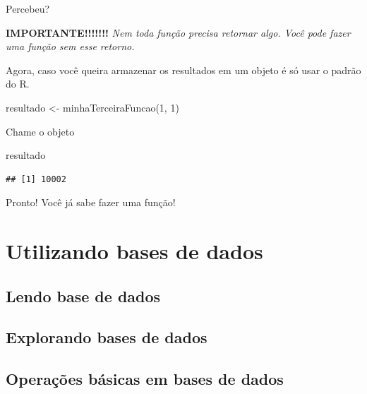 \documentclass[
]{book}
\newenvironment{Shaded}{\begin{snugshade}}{\end{snugshade}}
\newcommand{\DecValTok}[1]{\textcolor[rgb]{0.00,0.00,0.81}{#1}}
\newcommand{\FunctionTok}[1]{\textcolor[rgb]{0.00,0.00,0.00}{#1}}
\newcommand{\NormalTok}[1]{#1}
\newcommand{\OtherTok}[1]{\textcolor[rgb]{0.56,0.35,0.01}{#1}}
\begin{document}
Percebeu?

\textbf{IMPORTANTE!!!!!!!}
\emph{Nem toda função precisa retornar algo. Você pode fazer uma função sem esse retorno.}

Agora, caso você queira armazenar os resultados em um objeto é só usar o padrão do R.

\begin{Shaded}
\begin{Highlighting}[]
\NormalTok{resultado }\OtherTok{\textless{}{-}} \FunctionTok{minhaTerceiraFuncao}\NormalTok{(}\DecValTok{1}\NormalTok{, }\DecValTok{1}\NormalTok{)}
\end{Highlighting}
\end{Shaded}

Chame o objeto

\begin{Shaded}
\begin{Highlighting}[]
\NormalTok{resultado}
\end{Highlighting}
\end{Shaded}

\begin{verbatim}
## [1] 10002
\end{verbatim}

Pronto! Você já sabe fazer uma função!

\hypertarget{databases}{%
\chapter{Utilizando bases de dados}\label{databases}}

\hypertarget{lendo-base-de-dados}{%
\section{Lendo base de dados}\label{lendo-base-de-dados}}

\hypertarget{explorando-bases-de-dados}{%
\section{Explorando bases de dados}\label{explorando-bases-de-dados}}

\hypertarget{operauxe7uxf5es-buxe1sicas-em-bases-de-dados}{%
\section{Operações básicas em bases de dados}\label{operauxe7uxf5es-buxe1sicas-em-bases-de-dados}}
\end{document}
